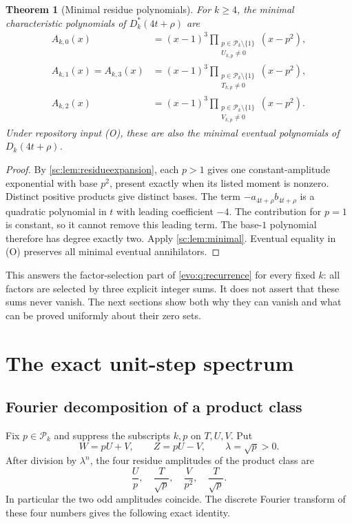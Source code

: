 \documentclass[11pt,a4paper]{article}
\numberwithin{equation}{section}
\newtheorem{theorem}{Theorem}[section]
\theoremstyle{definition}
\theoremstyle{remark}
\begin{document}
\begin{theorem}[Minimal residue polynomials]\label{sc:thm:residue}
For $k\ge4$, the minimal characteristic polynomials of
$D^*_k(4t+\rho)$ are
\begin{align}
 A_{k,0}(x)&=(x-1)^3
   \prod_{\substack{p\in\mathcal P_k\setminus\{1\}\\U_{k,p}\ne0}}(x-p^2),
   \label{sc:eq:res0}\\
 A_{k,1}(x)=A_{k,3}(x)&=(x-1)^3
   \prod_{\substack{p\in\mathcal P_k\setminus\{1\}\\T_{k,p}\ne0}}(x-p^2),
   \label{sc:eq:resodd}\\
 A_{k,2}(x)&=(x-1)^3
   \prod_{\substack{p\in\mathcal P_k\setminus\{1\}\\V_{k,p}\ne0}}(x-p^2).
   \label{sc:eq:res2}
\end{align}
Under repository input (O), these are also the minimal eventual
polynomials of $D_k(4t+\rho)$.
\end{theorem}
\begin{proof}
By \cref{sc:lem:residueexpansion}, each $p>1$ gives one constant-amplitude
exponential with base $p^2$, present exactly when its listed moment is
nonzero. Distinct positive products give distinct bases. The term
$-a_{4t+\rho}b_{4t+\rho}$ is a quadratic polynomial in $t$ with leading
coefficient $-4$. The contribution for $p=1$ is constant, so it cannot
remove this leading term. The base-$1$ polynomial therefore has degree
exactly two. Apply \cref{sc:lem:minimal}. Eventual equality in (O) preserves
all minimal eventual annihilators.
\end{proof}

This answers the factor-selection part of \cref{evo:q:recurrence} for every fixed
$k$: all factors are selected by three explicit integer sums. It does not
assert that these sums never vanish. The next sections show both why they
can vanish and what can be proved uniformly about their zero sets.

\section{The exact unit-step spectrum}\label{sc:sec:spectrum}

\subsection{Fourier decomposition of a product class}
Fix $p\in\mathcal P_k$ and suppress the subscripts $k,p$ on $T,U,V$. Put
\begin{equation}\label{sc:eq:WZ}
 W=pU+V,\qquad Z=pU-V,\qquad \lambda=\sqrt p>0.
\end{equation}
After division by $\lambda^n$, the four residue amplitudes of the product
class are
\begin{equation}\label{sc:eq:normalamps}
 \frac Up,\quad\frac T{\sqrt p},\quad\frac V{p^2},\quad\frac T{\sqrt p}.
\end{equation}
In particular the two odd amplitudes coincide. The discrete Fourier
transform of these four numbers gives the following exact identity.
\end{document}
